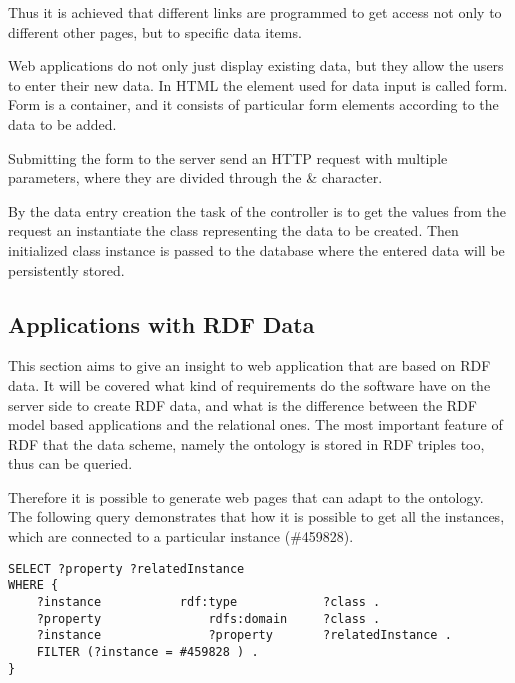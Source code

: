 
Thus it is achieved that different links are programmed to get access not only to different other pages, but to specific data items.
  

Web applications do not only just display existing data, but they allow the users to enter their new data. In HTML the element used for data input is called form. Form is a container, and it consists of particular form elements according to the data to be added. 


Submitting the form to the server send an HTTP request with multiple parameters, where they are divided through the \& character.


By the data entry creation the task of the controller is to get the values from the request an instantiate the class representing the data to be created. Then initialized class instance is passed to the database where the entered data will be persistently stored.



\subsection{Applications with RDF Data} \label{233}

This section aims to give an insight to web application that are based on RDF data. It will be covered what kind of requirements do the software have on the server side to create RDF data, and what is the difference between the RDF model based applications and the relational ones. The most important feature of RDF that the data scheme, namely the ontology is stored in RDF triples too, thus can be queried.


Therefore it is possible to generate web pages that can adapt to the ontology. The following query demonstrates that how it is possible to get all the instances, which are connected to a particular instance (\#459828).

\begin{lstlisting}[captionpos=b, caption= Dynamic SPARQL query, label=skullJSON,
basicstyle=\footnotesize,frame=single]
SELECT ?property ?relatedInstance
WHERE {
	?instance 			rdf:type  			?class .  
	?property				rdfs:domain		?class .
	?instance				?property 		?relatedInstance .
	FILTER (?instance = #459828 ) .
}
\end{lstlisting}


